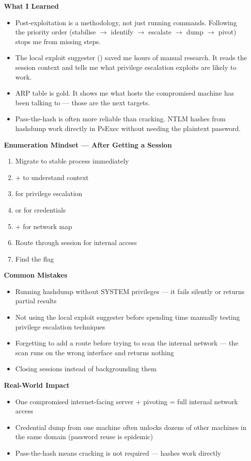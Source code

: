 \begin{takebox}
\textbf{What I Learned}
\begin{itemize}
  \item Post-exploitation is a methodology, not just running commands. Following
        the priority order (stabilise $\rightarrow$ identify $\rightarrow$
        escalate $\rightarrow$ dump $\rightarrow$ pivot) stops me from missing
        steps.
  \item The local exploit suggester ()
        saved me hours of manual research. It reads the session context and tells
        me what privilege escalation exploits are likely to work.
  \item ARP table is gold. It shows me what hosts the compromised machine has
        been talking to --- those are the next targets.
  \item Pass-the-hash is often more reliable than cracking. NTLM hashes from
        hashdump work directly in PsExec without needing the plaintext password.
\end{itemize}

\textbf{Enumeration Mindset --- After Getting a Session}
\begin{enumerate}
  \item Migrate to stable process immediately
  \item {} +  to understand context
  \item {} for privilege escalation
  \item {} or  for credentials
  \item {} +  for network map
  \item Route through session for internal access
  \item Find the flag
\end{enumerate}

\textbf{Common Mistakes}
\begin{itemize}
  \item Running hashdump without SYSTEM privileges --- it fails silently or
        returns partial results
  \item Not using the local exploit suggester before spending time manually
        testing privilege escalation techniques
  \item Forgetting to add a route before trying to scan the internal network ---
        the scan runs on the wrong interface and returns nothing
  \item Closing sessions instead of backgrounding them
\end{itemize}

\textbf{Real-World Impact}
\begin{itemize}
  \item One compromised internet-facing server + pivoting = full internal network
        access
  \item Credential dump from one machine often unlocks dozens of other machines
        in the same domain (password reuse is epidemic)
  \item Pass-the-hash means cracking is not required --- hashes work directly
\end{itemize}
\end{takebox}
